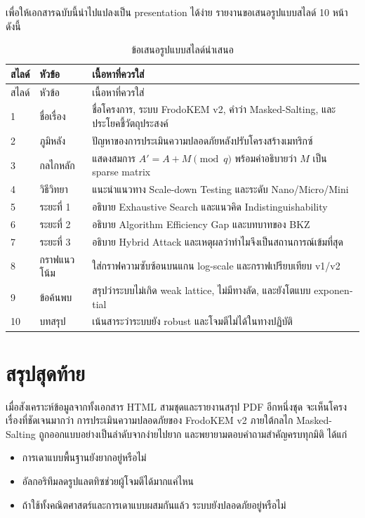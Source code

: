 \documentclass[12pt,a4paper]{article}
\newcommand{\eng}[1]{\textenglish{#1}}
\begin{document}
	เพื่อให้เอกสารฉบับนี้นำไปแปลงเป็น \eng{presentation} ได้ง่าย รายงานขอเสนอรูปแบบสไลด์ 10 หน้า ดังนี้
	
	\begin{longtable}{p{} p{} p{}}
		\caption{ข้อเสนอรูปแบบสไลด์นำเสนอ}\\
		\toprule
		สไลด์ & หัวข้อ & เนื้อหาที่ควรใส่ \\
		\midrule
		\endfirsthead
		\toprule
		สไลด์ & หัวข้อ & เนื้อหาที่ควรใส่ \\
		\midrule
		\endhead
		1 & ชื่อเรื่อง & ชื่อโครงการ, ระบบ \eng{FrodoKEM v2}, คำว่า \eng{Masked-Salting}, และประโยคชี้วัตถุประสงค์ \\
		2 & ภูมิหลัง & ปัญหาของการประเมินความปลอดภัยหลังปรับโครงสร้างเมทริกซ์ \\
		3 & กลไกหลัก & แสดงสมการ $A' = A + M \pmod q$ พร้อมคำอธิบายว่า $M$ เป็น \eng{sparse matrix} \\
		4 & วิธีวิทยา & แนะนำแนวทาง \eng{Scale-down Testing} และระดับ \eng{Nano/Micro/Mini} \\
		5 & ระยะที่ 1 & อธิบาย \eng{Exhaustive Search} และแนวคิด \eng{Indistinguishability} \\
		6 & ระยะที่ 2 & อธิบาย \eng{Algorithm Efficiency Gap} และบทบาทของ \eng{BKZ} \\
		7 & ระยะที่ 3 & อธิบาย \eng{Hybrid Attack} และเหตุผลว่าทำไมจึงเป็นสถานการณ์เข้มที่สุด \\
		8 & กราฟแนวโน้ม & ใส่กราฟความซับซ้อนบนแกน \eng{log-scale} และกราฟเปรียบเทียบ \eng{v1/v2} \\
		9 & ข้อค้นพบ & สรุปว่าระบบไม่เกิด \eng{weak lattice}, ไม่มีทางลัด, และยังโตแบบ \eng{exponential} \\
		10 & บทสรุป & เน้นสาระว่าระบบยัง \eng{robust} และโจมตีไม่ได้ในทางปฏิบัติ \\
		\bottomrule
	\end{longtable}
	
	\section{สรุปสุดท้าย}
	
	เมื่อสังเคราะห์ข้อมูลจากทั้งเอกสาร \eng{HTML} สามชุดและรายงานสรุป \eng{PDF} อีกหนึ่งชุด จะเห็นโครงเรื่องที่ชัดเจนมากว่า การประเมินความปลอดภัยของ \eng{FrodoKEM v2} ภายใต้กลไก \eng{Masked-Salting} ถูกออกแบบอย่างเป็นลำดับจากง่ายไปยาก และพยายามตอบคำถามสำคัญครบทุกมิติ ได้แก่
	\begin{itemize}
		\item การเดาแบบพื้นฐานยังยากอยู่หรือไม่
		\item อัลกอริทึมลดรูปแลตทิซช่วยผู้โจมตีได้มากแค่ไหน
		\item ถ้าใช้ทั้งคณิตศาสตร์และการเดาแบบผสมกันแล้ว ระบบยังปลอดภัยอยู่หรือไม่
	\end{itemize}
	
\end{document}
